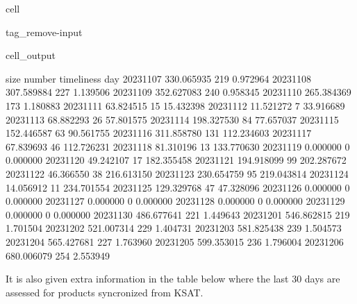 \documentclass[letterpaper,10pt,english]{jupyterBook}
\begin{document}
\begin{sphinxuseclass}{cell}
\begin{sphinxuseclass}{tag_remove-input}\begin{sphinxVerbatimOutput}

\begin{sphinxuseclass}{cell_output}
\begin{sphinxVerbatim}[commandchars=\\\{\}]
                  size  number  timeliness
day                                       
2023\PYGZhy{}11\PYGZhy{}07  330.065935     219    0.972964
2023\PYGZhy{}11\PYGZhy{}08  307.589884     227    1.139506
2023\PYGZhy{}11\PYGZhy{}09  352.627083     240    0.958345
2023\PYGZhy{}11\PYGZhy{}10  265.384369     173    1.180883
2023\PYGZhy{}11\PYGZhy{}11   63.824515      15   15.432398
2023\PYGZhy{}11\PYGZhy{}12   11.521272       7   33.916689
2023\PYGZhy{}11\PYGZhy{}13   68.882293      26   57.801575
2023\PYGZhy{}11\PYGZhy{}14  198.327530      84   77.657037
2023\PYGZhy{}11\PYGZhy{}15  152.446587      63   90.561755
2023\PYGZhy{}11\PYGZhy{}16  311.858780     131  112.234603
2023\PYGZhy{}11\PYGZhy{}17   67.839693      46  112.726231
2023\PYGZhy{}11\PYGZhy{}18   81.310196      13  133.770630
2023\PYGZhy{}11\PYGZhy{}19    0.000000       0    0.000000
2023\PYGZhy{}11\PYGZhy{}20   49.242107      17  182.355458
2023\PYGZhy{}11\PYGZhy{}21  194.918099      99  202.287672
2023\PYGZhy{}11\PYGZhy{}22   46.366550      38  216.613150
2023\PYGZhy{}11\PYGZhy{}23  230.654759      95  219.043814
2023\PYGZhy{}11\PYGZhy{}24   14.056912      11  234.701554
2023\PYGZhy{}11\PYGZhy{}25  129.329768      47   47.328096
2023\PYGZhy{}11\PYGZhy{}26    0.000000       0    0.000000
2023\PYGZhy{}11\PYGZhy{}27    0.000000       0    0.000000
2023\PYGZhy{}11\PYGZhy{}28    0.000000       0    0.000000
2023\PYGZhy{}11\PYGZhy{}29    0.000000       0    0.000000
2023\PYGZhy{}11\PYGZhy{}30  486.677641     221    1.449643
2023\PYGZhy{}12\PYGZhy{}01  546.862815     219    1.701504
2023\PYGZhy{}12\PYGZhy{}02  521.007314     229    1.404731
2023\PYGZhy{}12\PYGZhy{}03  581.825438     239    1.504573
2023\PYGZhy{}12\PYGZhy{}04  565.427681     227    1.763960
2023\PYGZhy{}12\PYGZhy{}05  599.353015     236    1.796004
2023\PYGZhy{}12\PYGZhy{}06  680.006079     254    2.553949
\end{sphinxVerbatim}

\end{sphinxuseclass}\end{sphinxVerbatimOutput}

\end{sphinxuseclass}
\end{sphinxuseclass}
\sphinxAtStartPar
It is also given extra information in the table below where the last 30 days are assessed for products syncronized from KSAT.
\end{document}
